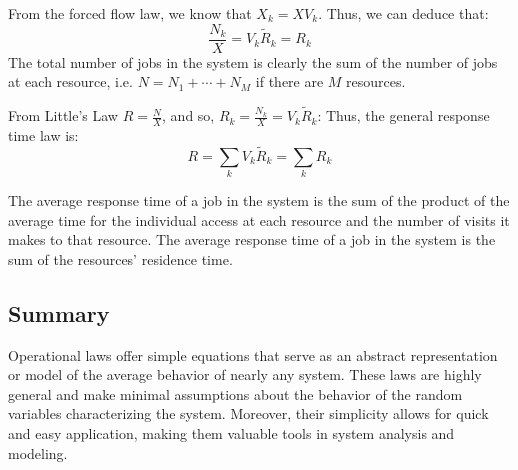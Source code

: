 From the forced flow law, we know that $X_k=XV_k$. 
Thus, we can deduce that:
\[\dfrac{N_k}{X}=V_k\tilde{R}_k=R_k\]
The total number of jobs in the system is clearly the sum of the number of jobs at each resource, i.e. $N = N_1 +\cdots+ N_M$ if there are $M$ resources.

From Little's Law $R=\frac{N}{X}$, and so, $R_k=\frac{N_k}{X}=V_k\tilde{R}_k$: 
Thus, the general response time law is:
\[R=\sum_kV_k\tilde{R}_k=\sum_kR_k\]

The average response time of a job in the system is the sum of the product of the average time for the individual access at each resource and the number of visits it makes to that resource. 
The average response time of a job in the system is the sum of the resources' residence time.

\subsection{Summary}
Operational laws offer simple equations that serve as an abstract representation or model of the average behavior of nearly any system. 
These laws are highly general and make minimal assumptions about the behavior of the random variables characterizing the system.
Moreover, their simplicity allows for quick and easy application, making them valuable tools in system analysis and modeling.